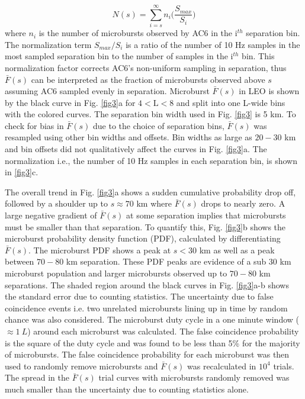 \documentclass[draft]{agujournal2019}
\begin{document}
\begin{equation}
N(s) = \sum_{i = s}^\infty n_{i} \Big( \frac{S_{max}}{S_{i}} \Big)
\end{equation} where $n_{i}$ is the number of microbursts observed by AC6 in the i$^{th}$ separation bin. The normalization term $S_{max}/S_{i}$ is a ratio of the number of 10 Hz samples in the most sampled separation bin to the number of samples in the i$^{th}$ bin. This normalization factor corrects AC6's non-uniform sampling in separation, thus $\bar{F}(s)$ can be interpreted as the fraction of microbursts observed above $s$ assuming AC6 sampled evenly in separation. Microburst $\bar{F}(s)$ in LEO is shown by the black curve in Fig. \ref{fig3}a for $4 < \mathrm{L}< 8$ and split into one L-wide bins with the colored curves. The separation bin width used in Fig. \ref{fig3} is 5 km. To check for bias in $\bar{F}(s)$ due to the choice of separation bins, $\bar{F}(s)$ was resampled using other bin widths and offsets. Bin widths as large as $20-30$ km and bin offsets did not qualitatively affect the curves in Fig. \ref{fig3}a. The normalization i.e., the number of 10 Hz samples in each separation bin, is shown in \ref{fig3}c.

The overall trend in Fig. \ref{fig3}a shows a sudden cumulative probability drop off, followed by a shoulder up to $s \approx 70$ km where $\bar{F}(s)$ drops to nearly zero. A large negative gradient of $\bar{F}(s)$ at some separation implies that microbursts must be smaller than that separation. To quantify this, Fig. \ref{fig3}b shows the microburst probability density function (PDF), calculated by differentiating $\bar{F}(s)$. The microburst PDF shows a peak at $s < 30$ km as well as a peak between $70-80$ km separation. These PDF peaks are evidence of a sub $30$ km microburst population and larger microbursts observed up to $70-80$ km separations. The shaded region around the black curves in Fig. \ref{fig3}a-b shows the standard error due to counting statistics. The uncertainty due to false coincidence events i.e. two unrelated microbursts lining up in time by random chance was also considered. The microburst duty cycle in a one minute window ($\approx 1 \ L$) around each microburst was calculated. The false coincidence probability is the square of the duty cycle and was found to be less than 5\% for the majority of microbursts. The false coincidence probability for each microburst was then used to randomly remove microbursts and $\bar{F}(s)$ was recalculated in $10^4$ trials. The spread in the $\bar{F}(s)$ trial curves with microbursts randomly removed was much smaller than the uncertainty due to counting statistics alone.
\end{document}
